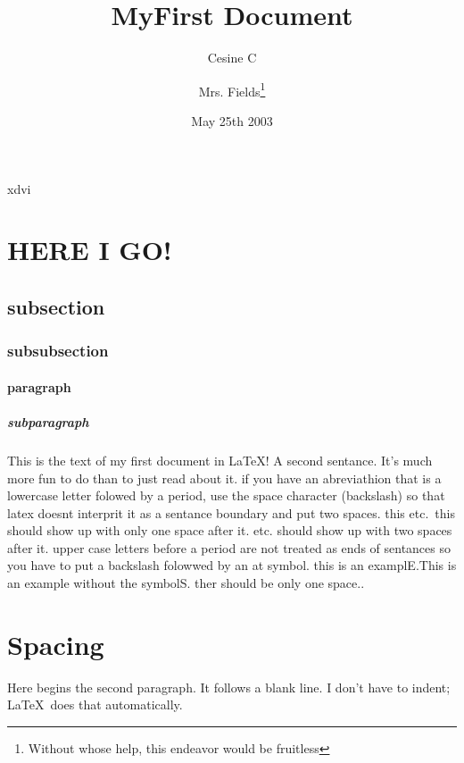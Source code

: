\documentclass[12pt,twoside,leqno]{article}%
\begin{document}
\pagestyle{headings}
xdvi %


\title{MyFirst Document}
\author{Cesine C \and Mrs. Fields\thanks{Without whose help, this endeavor would be fruitless}}
\date{May 25th 2003}%

\maketitle
\tableofcontents
\clearpage %
\section{HERE I GO!}
\label{I_Go}
\subsection{subsection}
\subsubsection{subsubsection}
\paragraph{paragraph}
\subparagraph{subparagraph}

This is the text of my first document in \LaTeX!
A     second     sentance.
It's much more fun to do \LaTeXe{}than to
just read about it.
if you have an abreviathion that is a lowercase letter folowed by a period, use the space character (backslash) so that latex doesnt interprit it as a sentance boundary and put two spaces. this  etc.\ this should show up with only one space after it. etc. should show up with two spaces after it. upper case letters before a period are not treated as ends of sentances so you have to put a backslash folowwed by an at symbol. this is an examplE.\@ This is an example without the symbolS. ther should be only one space..
\section{Spacing}
Here begins the second paragraph. It follows a blank line. I don't have to indent; \LaTeX\ does that automatically.
\end{document}
